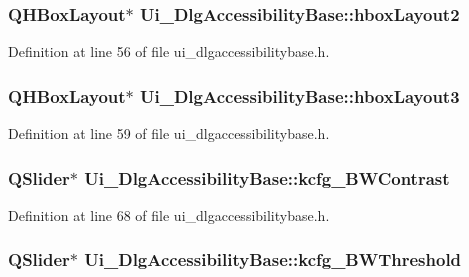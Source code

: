 \hypertarget{classUi__DlgAccessibilityBase_a34b627c6efb167bcdb5222438bdbf99e}{
\subsubsection[{hbox\+Layout2}]{\setlength{\rightskip}{0pt plus 5cm}Q\+H\+Box\+Layout$\ast$ Ui\+\_\+\+Dlg\+Accessibility\+Base\+::hbox\+Layout2}}\label{classUi__DlgAccessibilityBase_a34b627c6efb167bcdb5222438bdbf99e}


Definition at line 56 of file ui\+\_\+dlgaccessibilitybase.\+h.

\hypertarget{classUi__DlgAccessibilityBase_a57d0e60ec2c59778e84266108b3c9d03}{
\subsubsection[{hbox\+Layout3}]{\setlength{\rightskip}{0pt plus 5cm}Q\+H\+Box\+Layout$\ast$ Ui\+\_\+\+Dlg\+Accessibility\+Base\+::hbox\+Layout3}}\label{classUi__DlgAccessibilityBase_a57d0e60ec2c59778e84266108b3c9d03}


Definition at line 59 of file ui\+\_\+dlgaccessibilitybase.\+h.

\hypertarget{classUi__DlgAccessibilityBase_a4b034ff4228747708c7eeba77bc58734}{
\subsubsection[{kcfg\+\_\+\+B\+W\+Contrast}]{\setlength{\rightskip}{0pt plus 5cm}Q\+Slider$\ast$ Ui\+\_\+\+Dlg\+Accessibility\+Base\+::kcfg\+\_\+\+B\+W\+Contrast}}\label{classUi__DlgAccessibilityBase_a4b034ff4228747708c7eeba77bc58734}


Definition at line 68 of file ui\+\_\+dlgaccessibilitybase.\+h.

\hypertarget{classUi__DlgAccessibilityBase_a7be84a94ca25ab0c8bf269ef4fd69294}{
\subsubsection[{kcfg\+\_\+\+B\+W\+Threshold}]{\setlength{\rightskip}{0pt plus 5cm}Q\+Slider$\ast$ Ui\+\_\+\+Dlg\+Accessibility\+Base\+::kcfg\+\_\+\+B\+W\+Threshold}}\label{classUi__DlgAccessibilityBase_a7be84a94ca25ab0c8bf269ef4fd69294}



